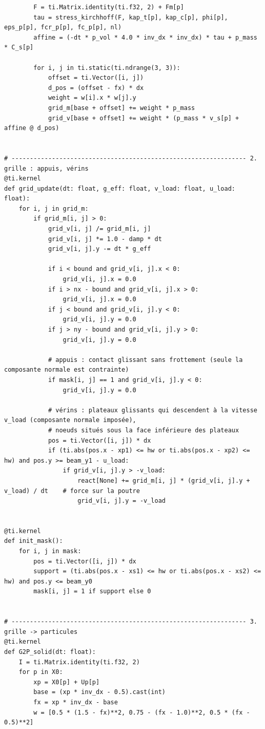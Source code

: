 \documentclass[11pt,a4paper]{article}
\begin{document}
\begin{lstlisting}
        F = ti.Matrix.identity(ti.f32, 2) + Fm[p]
        tau = stress_kirchhoff(F, kap_t[p], kap_c[p], phi[p], eps_p[p], fcr_p[p], fc_p[p], nl)
        affine = (-dt * p_vol * 4.0 * inv_dx * inv_dx) * tau + p_mass * C_s[p]

        for i, j in ti.static(ti.ndrange(3, 3)):
            offset = ti.Vector([i, j])
            d_pos = (offset - fx) * dx
            weight = w[i].x * w[j].y
            grid_m[base + offset] += weight * p_mass
            grid_v[base + offset] += weight * (p_mass * v_s[p] + affine @ d_pos)


# ---------------------------------------------------------------- 2. grille : appuis, vérins
@ti.kernel
def grid_update(dt: float, g_eff: float, v_load: float, u_load: float):
    for i, j in grid_m:
        if grid_m[i, j] > 0:
            grid_v[i, j] /= grid_m[i, j]
            grid_v[i, j] *= 1.0 - damp * dt
            grid_v[i, j].y -= dt * g_eff

            if i < bound and grid_v[i, j].x < 0:
                grid_v[i, j].x = 0.0
            if i > nx - bound and grid_v[i, j].x > 0:
                grid_v[i, j].x = 0.0
            if j < bound and grid_v[i, j].y < 0:
                grid_v[i, j].y = 0.0
            if j > ny - bound and grid_v[i, j].y > 0:
                grid_v[i, j].y = 0.0

            # appuis : contact glissant sans frottement (seule la composante normale est contrainte)
            if mask[i, j] == 1 and grid_v[i, j].y < 0:
                grid_v[i, j].y = 0.0

            # vérins : plateaux glissants qui descendent à la vitesse v_load (composante normale imposée),
            # noeuds situés sous la face inférieure des plateaux
            pos = ti.Vector([i, j]) * dx
            if (ti.abs(pos.x - xp1) <= hw or ti.abs(pos.x - xp2) <= hw) and pos.y >= beam_y1 - u_load:
                if grid_v[i, j].y > -v_load:
                    react[None] += grid_m[i, j] * (grid_v[i, j].y + v_load) / dt    # force sur la poutre
                    grid_v[i, j].y = -v_load


@ti.kernel
def init_mask():
    for i, j in mask:
        pos = ti.Vector([i, j]) * dx
        support = (ti.abs(pos.x - xs1) <= hw or ti.abs(pos.x - xs2) <= hw) and pos.y <= beam_y0
        mask[i, j] = 1 if support else 0


# ---------------------------------------------------------------- 3. grille -> particules
@ti.kernel
def G2P_solid(dt: float):
    I = ti.Matrix.identity(ti.f32, 2)
    for p in X0:
        xp = X0[p] + Up[p]
        base = (xp * inv_dx - 0.5).cast(int)
        fx = xp * inv_dx - base
        w = [0.5 * (1.5 - fx)**2, 0.75 - (fx - 1.0)**2, 0.5 * (fx - 0.5)**2]


\end{lstlisting}
\end{document}
